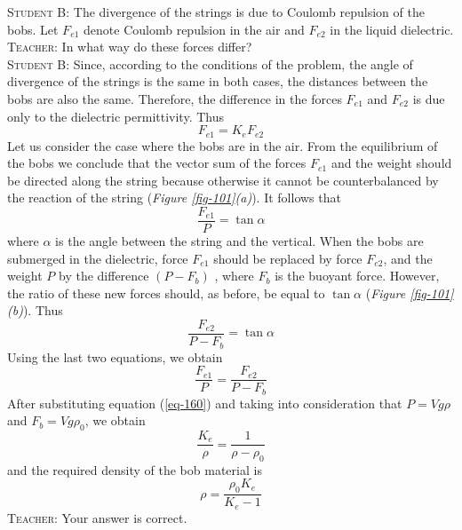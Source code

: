 \documentclass[a4paper,sfsidenotes]{tufte-book}
\begin{document}
\textsc{Student B:} The divergence of the strings is due to Coulomb repulsion of the bobs. Let $F_{e1}$ denote Coulomb repulsion in the air and $F_{e2}$ in the liquid dielectric.
\\
\textsc{Teacher:} In what way do these forces differ?
\\
\textsc{Student B:} Since, according to the conditions of the problem, the angle of divergence of the strings is the same in both cases, the distances between the bobs are also the same. Therefore, the difference in the forces $F_{e1}$ and $F_{e2}$ is due only to the dielectric permittivity. Thus
\begin{equation}%
F_{e1} = K_{e}F_{e2}
\label{eq-160}
\end{equation}
Let us consider the case where the bobs are in the air. From the equilibrium of the bobs we conclude that the vector sum of the forces $F_{e1}$ and the weight should be directed along the string because otherwise it cannot be counterbalanced by the reaction of the string (\emph{Figure \ref{fig-101}(a)}). It follows that
\begin{equation*}%
\frac{F_{e1}}{P} = \tan \alpha
\end{equation*}
where $\alpha$ is the angle between the string and the vertical. When the bobs are submerged in the dielectric, force $F_{e1}$ should be replaced by force $F_{e2}$, and the weight $P$ by the difference $(P-F_{b})$ , where $F_{b}$ is the buoyant force. However, the ratio of these new forces should, as before, be equal to $\tan \alpha$ (\emph{Figure \ref{fig-101}(b)}). Thus
\begin{equation*}%
\frac{F_{e2}}{P - F_{b}} = \tan \alpha
\end{equation*}
Using the last two equations, we obtain
\begin{equation*}%
\frac{F_{e1}}{P} = \frac{F_{e2}}{P - F_{b}}
\end{equation*}
After substituting equation (\ref{eq-160}) and taking into consideration that $P=Vg\rho$ and $F_{b}=Vg\rho_{0}$, we obtain
\begin{equation*}%
\frac{K_{e}}{\rho} = \frac{1}{\rho - \rho_{0}}
\end{equation*}
and the required density of the bob material is
\begin{equation}%
\rho = \frac{\rho_{0} K_{e}}{K_{e} - 1}
\label{eq-161}
\end{equation}
\textsc{Teacher:} Your answer is correct.
\end{document}
